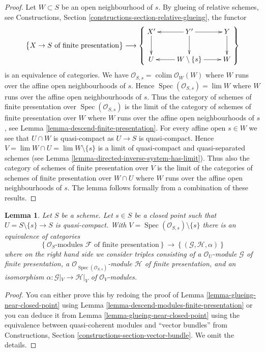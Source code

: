 \documentclass{stacks-project}
\theoremstyle{plain}
\newtheorem{lemma}[subsection]{Lemma}
\theoremstyle{definition}
\theoremstyle{remark}
\numberwithin{equation}{subsection}
\def\lim{\mathop{\mathrm{lim}}\nolimits}
\def\colim{\mathop{\mathrm{colim}}\nolimits}
\def\Spec{\mathop{\mathrm{Spec}}}
\begin{document}
\begin{proof}
Let $W \subset S$ be an open neighbourhood of $s$. By
glueing of relative schemes, see
Constructions, Section \ref{constructions-section-relative-glueing},
the functor
$$
\left\{
\begin{matrix}
X \to S\text{ of finite presentation}
\end{matrix}
\right\}
\longrightarrow
\left\{
\vcenter{
\xymatrix{
X' \ar[d] & Y' \ar[d] \ar[l] \ar[r] & Y \ar[d] \\
U & W \setminus \{s\} \ar[l] \ar[r] & W
}
}
\right\}
$$
is an equivalence of categories. We have
$\mathcal{O}_{S, s} = \colim \mathcal{O}_W(W)$ where
$W$ runs over the affine open neighbourhoods of $s$.
Hence $\Spec(\mathcal{O}_{S, s}) = \lim W$ where $W$
runs over the affine open neighbourhoods of $s$.
Thus the category of schemes of finite presentation
over $\Spec(\mathcal{O}_{S, s})$ is the limit of the
category of schemes of finite presentation over
$W$ where $W$ runs over the affine open neighbourhoods
of $s$, see
Lemma \ref{lemma-descend-finite-presentation}.
For every affine open $s \in W$ we see that $U \cap W$
is quasi-compact as $U \to S$ is quasi-compact.
Hence $V = \lim W \cap U = \lim W \setminus \{s\}$ is a limit of
quasi-compact and quasi-separated schemes (see
Lemma \ref{lemma-directed-inverse-system-has-limit}).
Thus also the category of schemes of finite presentation
over $V$ is the limit of the
categories of schemes of finite presentation over
$W \cap U$ where $W$ runs over the affine open neighbourhoods
of $s$. The lemma follows formally from a combination
of these results.
\end{proof}

\begin{lemma}
\label{lemma-glueing-near-closed-point-modules}
Let $S$ be a scheme. Let $s \in S$ be a closed point such that
$U = S \setminus \{s\} \to S$ is quasi-compact. With
$V = \Spec(\mathcal{O}_{S, s}) \setminus \{s\}$ there is
an equivalence of categories
$$
\left\{
\mathcal{O}_S\text{-modules }\mathcal{F}\text{ of finite presentation}
\right\}
\longrightarrow
\left\{
(\mathcal{G}, \mathcal{H}, \alpha)
\right\}
$$
where on the right hand side we consider triples
consisting of a $\mathcal{O}_U$-module $\mathcal{G}$ of
finite presentation, a $\mathcal{O}_{\Spec(\mathcal{O}_{S, s})}$-module
$\mathcal{H}$ of finite presentation, and an isomorphism
$\alpha : \mathcal{G}|_V \to \mathcal{H}|_V$ of
$\mathcal{O}_V$-modules.
\end{lemma}

\begin{proof}
You can either prove this by
redoing the proof of Lemma \ref{lemma-glueing-near-closed-point}
using Lemma \ref{lemma-descend-modules-finite-presentation}
or you can deduce it from Lemma \ref{lemma-glueing-near-closed-point}
using the equivalence between quasi-coherent modules and
``vector bundles'' from
Constructions, Section \ref{constructions-section-vector-bundle}.
We omit the details.
\end{proof}
\end{document}
